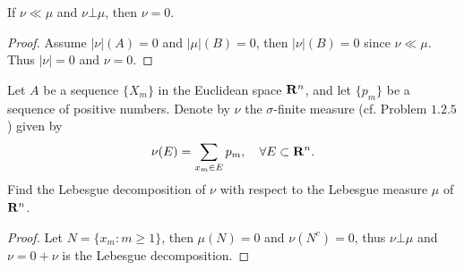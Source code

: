 \begin{pro}%
	If $\nu\ll\mu$ and $\nu\bot\mu$, then $\nu=0$.
\end{pro}
\begin{proof}
	Assume $|\nu|(A)=0$ and $|\mu|(B)=0$, then $|\nu|(B)=0$ since $\nu\ll\mu$. Thus $|\nu|=0$ and $\nu=0$.
\end{proof}

\begin{pro}%
	Let $A$ be a sequence $\{X_m\}$ in the Euclidean space $\mathbf{R}^n$, and let $\{p_m\}$ be a sequence of positive numbers. Denote by $\nu$ the $\sigma$-finite measure (cf. Problem $1.2.5$) given by
	\[\nu(E)=\sum_{x_m\in E}p_m,\quad \forall E\subset \mathbf{R}^n.\]
	Find the Lebesgue decomposition of $\nu$ with respect to the Lebesgue measure $\mu$ of $\mathbf{R}^n$.
\end{pro}
\begin{proof}
	Let $N=\{x_m\colon m\geq 1\}$, then $\mu(N)=0$ and $\nu(N^c)=0$, thus $\nu\bot\mu$ and $\nu=0+\nu$ is the Lebesgue decomposition.
\end{proof}

